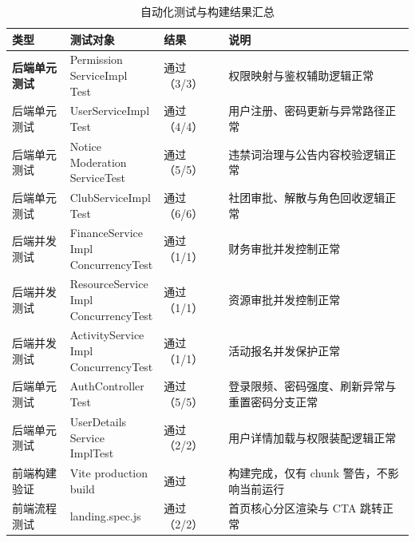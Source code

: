 \begin{table}[H]
\centering
\footnotesize
\setlength{\tabcolsep}{3pt}
\caption{自动化测试与构建结果汇总}
\label{tab:unit-result}
\begin{tabular}{p{2.2cm}p{2.8cm}p{1.8cm}p{6.1cm}}
\toprule
类型 & 测试对象 & 结果 & 说明 \\
\midrule
\textbf{后端单元测试} & \shortstack[l]{Permission\\ServiceImpl\\Test} & 通过（3/3） & 权限映射与鉴权辅助逻辑正常 \\
后端单元测试 & \shortstack[l]{UserServiceImpl\\Test} & 通过（4/4） & 用户注册、密码更新与异常路径正常 \\
后端单元测试 & \shortstack[l]{Notice\\Moderation\\ServiceTest} & 通过（5/5） & 违禁词治理与公告内容校验逻辑正常 \\
后端单元测试 & \shortstack[l]{ClubServiceImpl\\Test} & 通过（6/6） & 社团审批、解散与角色回收逻辑正常 \\
后端并发测试 & \shortstack[l]{FinanceService\\Impl\\ConcurrencyTest} & 通过（1/1） & 财务审批并发控制正常 \\
后端并发测试 & \shortstack[l]{ResourceService\\Impl\\ConcurrencyTest} & 通过（1/1） & 资源审批并发控制正常 \\
后端并发测试 & \shortstack[l]{ActivityService\\Impl\\ConcurrencyTest} & 通过（1/1） & 活动报名并发保护正常 \\
后端单元测试 & \shortstack[l]{AuthController\\Test} & 通过（5/5） & 登录限频、密码强度、刷新异常与重置密码分支正常 \\
后端单元测试 & \shortstack[l]{UserDetails\\Service\\ImplTest} & 通过（2/2） & 用户详情加载与权限装配逻辑正常 \\
前端构建验证 & \shortstack[l]{Vite production\\build} & 通过 & 构建完成，仅有 chunk 警告，不影响当前运行 \\
前端流程测试 & landing.spec.js & 通过（2/2） & 首页核心分区渲染与 CTA 跳转正常 \\

\end{tabular}
\end{table}
